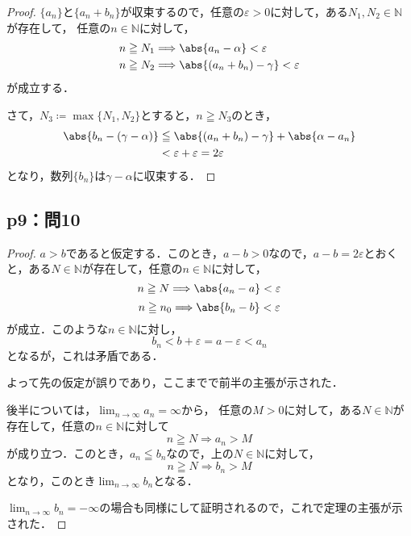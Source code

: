 \documentclass[uplatex,dvipdfmx,a4paper,10pt,fleqn]{jsarticle}
\begin{document}
    \begin{tleftbar}
        \begin{proof}
        $\{ a_n \}$と$ \{ a_n + b_n \}$が収束するので，任意の$\varepsilon >0$に対して，ある$N_1 , N_2 \in \mathbb{N}$が存在して，
        任意の$n \in \mathbb{N}$に対して，
        \begin{align*} 
            &n \geqq N_1 \Longrightarrow \abs{a_n - \alpha}<\varepsilon \\
            & n \geqq N_2 \Longrightarrow \abs{(a_n + b_n)-\gamma}<\varepsilon 
        \end{align*} 
        が成立する．

        さて，$N_3 \coloneqq \max \{ N_1 , N_2 \}$とすると，$n \geqq N_3$のとき，
        \begin{align*} 
            \abs{b_n - (\gamma - \alpha )} & \leqq  \abs{(a_n+b_n)-\gamma} + \abs{\alpha - a_n} \\
            & < \varepsilon + \varepsilon = 2 \varepsilon 
        \end{align*}
        となり，数列$\{b_n \}$は$\gamma - \alpha $に収束する．
    \end{proof}
    \end{tleftbar}

        \subsection*{p9：問10}
    

\begin{tleftbar}
    \begin{proof}
        $a>b$であると仮定する．このとき，$a-b >0$なので，$a-b=2 \varepsilon$とおくと，ある$N \in \mathbb{N}$が存在して，任意の$n \in \mathbb{N}$に対して，
        \[
            n \geqq N \Longrightarrow \abs{a_n -a} < \varepsilon
        \]
        \[
            n \geqq n_0 \Longrightarrow \abs{b_n -b} <\varepsilon
        \]
        が成立．このような$n \in \mathbb{N}$に対し，
        \[
            b_n< b+\varepsilon = a-\varepsilon < a_n
        \]
        となるが，これは矛盾である．
        
        よって先の仮定が誤りであり，ここまでで前半の主張が示された．

        後半については，$\lim_{n \to \infty} a_n = \infty$から，
        任意の$M >0$に対して，ある$N \in \mathbb{N}$が存在して，任意の$n \in \mathbb{N}$に対して
        \[
            n \geqq N \Longrightarrow a_n >M 
        \]
        が成り立つ．このとき，$a_n \leqq b_n$なので，上の$N\in \mathbb{N}$に対して，
        \[
            n \geqq N \Longrightarrow b_n >M
        \]
        となり，このとき$\lim_{n \to \infty} b_n $となる．

        $\lim_{n \to \infty} b_n = -\infty$の場合も同様にして証明されるので，これで定理の主張が示された．
    \end{proof}
    \end{tleftbar}
\end{document}
